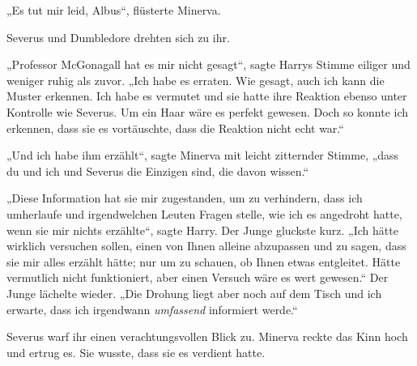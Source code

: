 „Es tut mir leid, Albus“, flüsterte Minerva.

Severus und Dumbledore drehten sich zu ihr.

„Professor McGonagall hat es mir nicht gesagt“, sagte Harrys Stimme eiliger und weniger ruhig als zuvor.
„Ich habe es erraten. Wie gesagt, auch ich kann die Muster erkennen. Ich habe es vermutet und sie hatte ihre Reaktion ebenso unter Kontrolle wie Severus. Um ein Haar wäre es perfekt gewesen. Doch so konnte ich erkennen, dass sie es vortäuschte, dass die Reaktion nicht echt war.“

„Und ich habe ihm erzählt“, sagte Minerva mit leicht zitternder Stimme, „dass du und ich und Severus die Einzigen sind, die davon wissen.“

„Diese Information hat sie mir zugestanden, um zu verhindern, dass ich umherlaufe und irgendwelchen Leuten Fragen stelle, wie ich es angedroht hatte, wenn sie mir nichts erzählte“, sagte Harry. Der Junge gluckste kurz.
„Ich hätte wirklich versuchen sollen, einen von Ihnen alleine abzupassen und zu sagen, dass sie mir alles erzählt hätte; nur um zu schauen, ob Ihnen etwas entgleitet. Hätte vermutlich nicht funktioniert, aber einen Versuch wäre es wert gewesen.“ Der Junge lächelte wieder.
„Die Drohung liegt aber noch auf dem Tisch und ich erwarte, dass ich irgendwann \emph{umfassend} informiert werde.“

Severus warf ihr einen verachtungsvollen Blick zu. Minerva reckte das Kinn hoch und ertrug es. Sie wusste, dass sie es verdient hatte.


